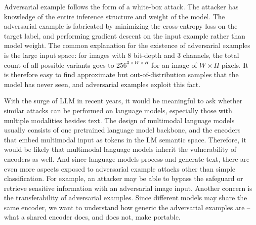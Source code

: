 \documentclass[conference]{IEEEtran}
\begin{document}
Adversarial example follows the form of a white-box attack. The attacker
has knowledge of the entire inference structure and weight of the model.
The adversarial example is fabricated by minimizing the cross-entropy loss
on the target label, and performing gradient descent on the input example
rather than model weight. The common explanation for the existence of
adversarial examples is the large input space: for images with 8 bit-depth
and 3 channels, the total count of all possible variants goes to
$256^{3\times W \times H}$ for an image of $W\times H$ pixels. It is
therefore easy to find approximate but
out-of-distribution samples that the model has never seen, and adversarial
examples exploit this fact.

With the surge of LLM in recent years, it would be meaningful to ask
whether similar attacks can be performed on language models, especially
those with multiple modalities besides text. The design of multimodal
language models usually consists of one pretrained language model backbone,
and the encoders that embed multimodal input as tokens in the LM semantic
space. Therefore, it would be likely that multimodal language models
inherit the vulnerability of encoders as well. And since language models
process and generate text, there are even more aspects exposed to
adversarial example attacks other than simple classification. For example,
an attacker may be able to bypass the safeguard or retrieve sensitive
information with an adversarial image input. Another concern is the
transferability of adversarial examples. Since different models may share
the same encoder, we want to understand how generic the adversarial
examples are -- what a shared encoder does, and does not, make portable.
\end{document}
